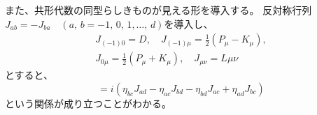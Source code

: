 \documentclass[../../master.tex]{subfiles}
\begin{document}
また、共形代数の同型らしきものが見える形を導入する。
反対称行列\(J_{ab}=-J_{ba}\quad(a,\,b = -1,\,0,\,1,\dots,\,d)\)を導入し、
\begin{equation}
    \begin{split}
        J_{(-1)0} = D, \quad J_{(-1)\mu} = \frac{1}{2}(P_\mu-K_\mu),\\
        J_{0\mu} = \frac{1}{2}(P_\mu + K_\mu),\quad J_{\mu\nu} = L{\mu\nu}
    \end{split}
\end{equation}
とすると、
\begin{equation}
    [J_{ab},\,J_{cd}] = i(\eta_{bc}J_{ad}-\eta_{ac}J_{bd}-\eta_{bd}J_{ac}+\eta_{ad}J_{bc})
\end{equation}
という関係が成り立つことがわかる。
\end{document}
